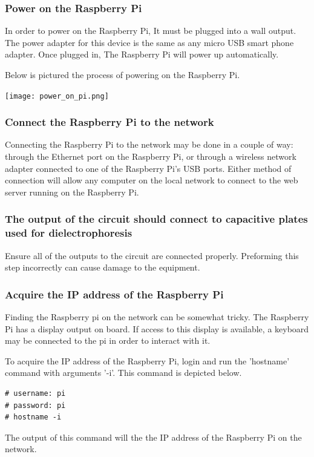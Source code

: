 \documentclass{article}	%
\begin{document}
\begin{multicols}{2}
\subsubsection{Power on the Raspberry Pi}
In order to power on the Raspberry Pi,
It must be plugged into a wall output.
The power adapter for this device is
the same as any micro USB smart phone adapter.
Once plugged in,
The Raspberry Pi will power up automatically.

Below is pictured the process of
powering on the Raspberry Pi.
\begin{center}
\texttt{[image: power\_on\_pi.png]}
\end{center}

\subsubsection{Connect the Raspberry Pi to the network}
Connecting the Raspberry Pi to the network may
be done in a couple of way:
through the Ethernet port on the Raspberry Pi, or
through a wireless network adapter connected to
one of the Raspberry Pi's USB ports.
Either method of connection will allow
any computer on the local network to 
connect to the web server running on the Raspberry Pi.

\subsubsection{The output of the circuit should connect to capacitive plates used for dielectrophoresis}
Ensure all of the outputs to the circuit are connected properly.
Preforming this step incorrectly can cause damage to the equipment.

\subsubsection{Acquire the IP address of the Raspberry Pi}
Finding the Raspberry pi on the network can be somewhat tricky.
The Raspberry Pi has a display output on board.
If access to this display is available,
a keyboard may be connected to the pi in order to
interact with it.

To acquire the IP address of the Raspberry Pi,
login and run the 'hostname' command with arguments '-i'.
This command is depicted below.
\begin{lstlisting}
# username: pi
# password: pi
# hostname -i
\end{lstlisting}
The output of this command will the the IP address of
the Raspberry Pi on the network.


\end{multicols}
\end{document}
